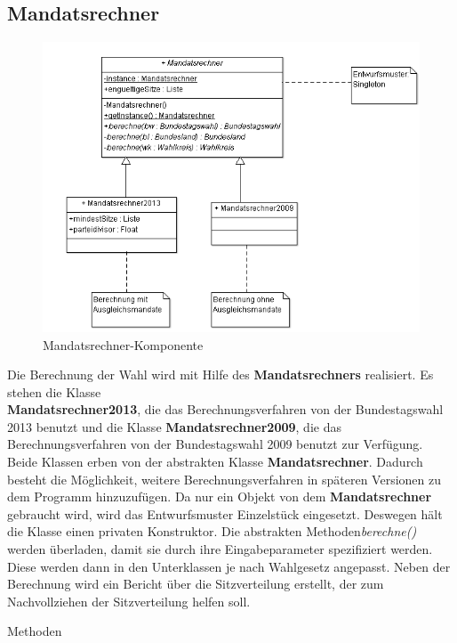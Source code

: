 \documentclass[12pt,a4paper,titlepage]{article}
\newcommand{\myma}{\fontfamily{pcr}\selectfont \textbf}
\newcommand{\mymo}{\fontfamily{pcr}\selectfont \textit}
\begin{document}
\newpage
\subsection{Mandatsrechner}
\begin{figure}[!ht]
\centering
\includegraphics[scale=0.6]{Mandatsrechneralles.png} \caption{Mandatsrechner-Komponente} 
\end{figure}
Die Berechnung der Wahl wird mit Hilfe des {\myma{Mandatsrechners}} realisiert. Es stehen die Klasse \\{\myma{Mandatsrechner2013}}, die das Berechnungsverfahren von der Bundestagswahl 2013 benutzt und die Klasse {\myma{Mandatsrechner2009}}, die das Berechnungsverfahren von der Bundestagswahl 2009 benutzt zur Verfügung. Beide Klassen erben von der abstrakten Klasse {\myma{Mandatsrechner}}. Dadurch besteht die Möglichkeit, weitere Berechnungsverfahren in späteren Versionen zu dem Programm hinzuzufügen. Da nur ein Objekt von dem {\myma{Mandatsrechner}} gebraucht wird, wird das Entwurfsmuster Einzelstück eingesetzt. Deswegen hält die Klasse einen privaten Konstruktor. Die abstrakten Methoden{\mymo{berechne()}} werden überladen, damit sie durch ihre Eingabeparameter spezifiziert werden. Diese werden dann in den Unterklassen je nach Wahlgesetz angepasst. Neben der Berechnung wird ein Bericht über die Sitzverteilung erstellt, der zum Nachvollziehen der Sitzverteilung helfen soll.
\begin{large}
Methoden 
\end{large}
\end{document}
